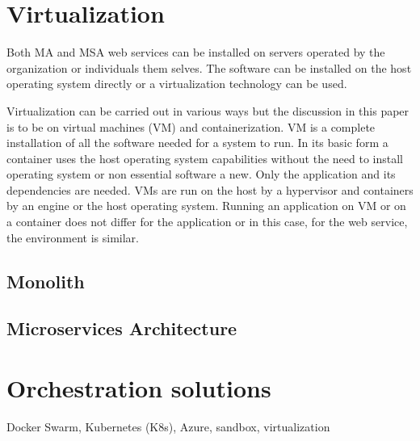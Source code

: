 

\section{Virtualization}
\begin{sloppypar}
    Both MA and MSA web services can be installed on servers operated by the
    organization or individuals them selves. The software can be installed on
    the host operating system directly or a virtualization technology can be
    used.
\end{sloppypar}
\begin{sloppypar}
    Virtualization can be carried out in various ways but the discussion in this
    paper is to be on virtual machines (VM) and containerization. VM is a
    complete installation of all the software needed for a system to run. In its
    basic form a container uses the host operating system capabilities without
    the need to install operating system or non essential software a new. Only
    the application and its dependencies are needed. VMs are run on the host by
    a hypervisor and containers by an engine or the host operating system.
    Running an application on VM or on a container does not differ for the
    application or in this case, for the web service, the environment is
    similar.
\end{sloppypar}

\subsection{Monolith}
\begin{sloppypar}

\end{sloppypar}

\begin{sloppypar}
\end{sloppypar}
\subsection{Microservices Architecture}




\section{Orchestration solutions}
\begin{sloppypar}
    Docker Swarm, Kubernetes (K8s), Azure, sandbox, virtualization 
\end{sloppypar}





